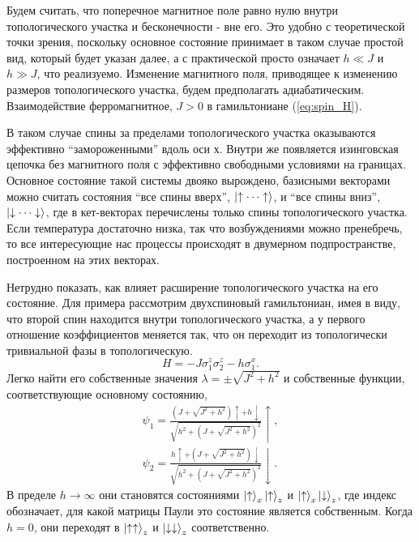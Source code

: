 \documentclass[a4paper,12pt]{article}
\theoremstyle{plain} %
\theoremstyle{definition} %
\theoremstyle{remark} %
\begin{document}
Будем считать, что поперечное магнитное поле равно нулю внутри топологического участка и бесконечности - вне его. Это удобно с теоретической точки зрения, поскольку основное состояние принимает в таком случае простой вид, который будет указан далее, а с практической просто означает $h \ll J$ и $h \gg J$, что реализуемо. Изменение магнитного поля, приводящее к изменению размеров топологического участка, будем предполагать адиабатическим. Взаимодействие ферромагнитное, $J>0$ в гамильтониане (\ref{eq:spin_H}).

В таком случае спины за пределами топологического участка оказываются эффективно ``замороженными'' вдоль оси $х$. Внутри же появляется изинговская цепочка без магнитного поля с эффективно свободными условиями на границах. Основное состояние такой системы двояко вырождено, базисными векторами можно считать состояния ``все спины вверх'', $\ket{\uparrow \dotsm \uparrow}$, и ``все спины вниз'', $\ket{\downarrow \dotsm \downarrow}$, где в кет-векторах перечислены только спины топологического участка. Если температура достаточно низка, так что возбуждениями можно пренебречь, то все интересующие нас процессы происходят в двумерном подпространстве, построенном на этих векторах. 

Нетрудно показать, как влияет расширение топологического участка на его состояние. Для примера рассмотрим двухспиновый гамильтониан, имея в виду, что второй спин находится внутри топологического участка, а у первого отношение коэффициентов меняется так, что он переходит из топологически тривиальной фазы в топологическую.
\begin{equation}
    H = -J \sigma_1^z \sigma_2^z - h \sigma_1^x.
    \label{eq:32_model_H}
\end{equation}
Легко найти его собственные значения $\lambda = \pm \sqrt{J^2 + h^2}$ и собственные функции, соответствующие основному состоянию,
\begin{gather*}
    \psi_1 = \frac{\left( J + \sqrt{J^2 + h^2} \right) \uparrow + h \downarrow}{\sqrt{h^2 + \left(J + \sqrt{J^2 + h^2} \right)^2}} \uparrow, \\
    \psi_2 = \frac{ h \uparrow + \left( J + \sqrt{J^2 + h^2} \right) \downarrow}{\sqrt{h^2 + \left(J + \sqrt{J^2 + h^2} \right)^2}} \downarrow.
\end{gather*}
В пределе $h \rightarrow \infty$ они становятся состояниями $\ket{\uparrow}_x \ket{\uparrow}_z$ и $\ket{\uparrow}_x \ket{\downarrow}_z$, где индекс обозначает, для какой матрицы Паули это состояние является собственным. Когда $h = 0$, они переходят в $\ket{\uparrow \uparrow}_z$ и $\ket{\downarrow \downarrow}_z$ соответственно.
\end{document}
